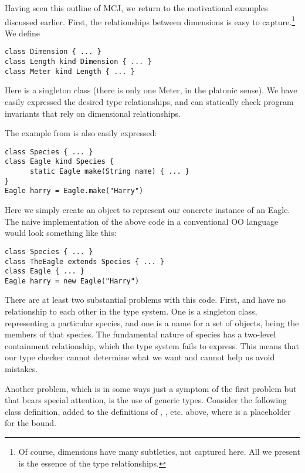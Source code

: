 \documentclass[10pt]{acm-sigplan}
\begin{document}
\label{examples}

Having seen this outline of MCJ, we return to the motivational
examples discussed earlier.  First, the relationships between
dimensions is easy to capture.\footnote{Of course, dimensions have
many subtleties, not captured here.  All we present is the essence of
the type relationships.} We define 

\begin{verbatim}
class Dimension { ... }
class Length kind Dimension { ... }
class Meter kind Length { ... }
\end{verbatim}

Here {} is a singleton class (there is only one Meter, in
the platonic sense).  We have easily expressed the desired type
relationships, and can statically check program invariants that rely
on dimensional relationships.

The example from \cite{FW96} is also easily expressed:

\begin{verbatim}
class Species { ... }
class Eagle kind Species {
      static Eagle make(String name) { ... }
}
Eagle harry = Eagle.make("Harry")
\end{verbatim}

Here we simply create an object to represent our concrete instance of
an Eagle.  The naive implementation of the above code in a
conventional OO language would look something like this:

\begin{verbatim}
class Species { ... }
class TheEagle extends Species { ... }
class Eagle { ... }
Eagle harry = new Eagle("Harry")
\end{verbatim}

There are at least two substantial problems with this code.  First,
{} and {} have no relationship to each other in
the type system.  One is a singleton class, representing a particular
species, and one is a name for a set of objects, being the members of
that species.  The fundamental nature of species has a two-level
containment relationship, which the type system fails to express.
This means that our type checker cannot determine what we want and
cannot help us avoid mistakes.

Another problem, which is in some ways just a symptom of the first
problem but that bears special attention, is the use of generic
types.  Consider the following class definition, added to the
definitions of , , etc. above, where
 is a placeholder for the bound.  
\end{document}
